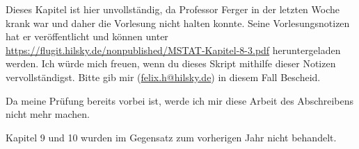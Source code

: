 Dieses Kapitel ist hier unvollständig, da Professor Ferger in der letzten Woche krank war
und daher die Vorlesung nicht halten konnte. Seine Vorlesungsnotizen hat er veröffentlicht
und können unter \url{https://flugit.hilsky.de/nonpublished/MSTAT-Kapitel-8-3.pdf} heruntergeladen
werden. Ich würde mich freuen, wenn du dieses Skript mithilfe dieser Notizen vervollständigst.
Bitte gib mir (\url{felix.h@hilsky.de}) in diesem Fall Bescheid.

Da meine Prüfung bereits vorbei ist, werde ich mir diese Arbeit des Abschreibens nicht mehr machen.

Kapitel 9 und 10 wurden im Gegensatz zum vorherigen Jahr nicht behandelt.

